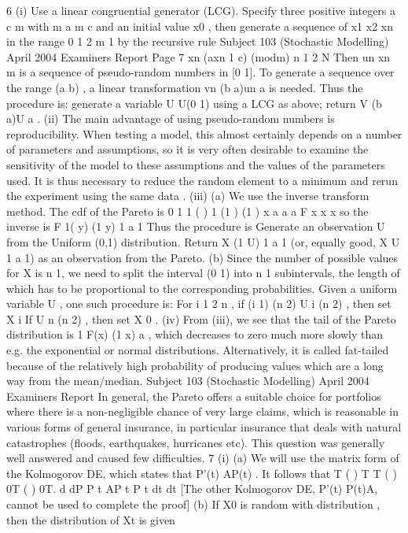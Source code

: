 \documentclass[a4paper,12pt]{article}
\begin{document}
\begin{enumerate}
6 (i) Use a linear congruential generator (LCG). Specify three positive integers
a c m with m a m c and an initial value x0 , then generate a sequence of
x1 x2 xn in the range {0 1 2 m 1} by the recursive rule
Subject 103 (Stochastic Modelling) April 2004 Examiners Report
Page 7
xn (axn 1 c) (modm) n 1 2 N
Then un xn m is a sequence of pseudo-random numbers in [0 1].
To generate a sequence over the range (a b) , a linear transformation
vn (b a)un a is needed. Thus the procedure is: generate a variable
U U(0 1) using a LCG as above; return V (b a)U a .
(ii) The main advantage of using pseudo-random numbers is reproducibility.
When testing a model, this almost certainly depends on a number of
parameters and assumptions, so it is very often desirable to examine the
sensitivity of the model to these assumptions and the values of the parameters
used. It is thus necessary to reduce the random element to a minimum and
rerun the experiment using the same data .
(iii) (a) We use the inverse transform method. The cdf of the Pareto is
0 1
1
( ) 1
(1 ) (1 )
x
a a
a
F x
x x
so the inverse is
F 1( y) (1 y) 1 a 1
Thus the procedure is
Generate an observation U from the Uniform (0,1) distribution.
Return X (1 U) 1 a 1 (or, equally good, X U 1 a 1) as an
observation from the Pareto.
(b) Since the number of possible values for X is n 1, we need to split
the interval (0 1) into n 1 subintervals, the length of which has to be
proportional to the corresponding probabilities. Given a uniform
variable U , one such procedure is:
For i 1 2 n , if (i 1) (n 2) U i (n 2) , then set X i
If U n (n 2) , then set X 0 .
(iv) From (iii), we see that the tail of the Pareto distribution is 1 F(x) (1 x) a ,
which decreases to zero much more slowly than e.g. the exponential or normal
distributions.
Alternatively, it is called fat-tailed because of the relatively high probability
of producing values which are a long way from the mean/median.
Subject 103 (Stochastic Modelling) April 2004 Examiners Report
In general, the Pareto offers a suitable choice for portfolios where there is a
non-negligible chance of very large claims, which is reasonable in various
forms of general insurance, in particular insurance that deals with natural
catastrophes (floods, earthquakes, hurricanes etc).
This question was generally well answered and caused few difficulties.
7 (i) (a) We will use the matrix form of the Kolmogorov DE, which states that
P'(t) AP(t) .
It follows that T ( ) T T ( ) 0T ( ) 0T. d dP
P t AP t P t
dt dt
[The other Kolmogorov DE, P'(t) P(t)A, cannot be used to complete the proof]
(b) If X0 is random with distribution , then the distribution of Xt is given

\end{enumerate}
\end{document}
